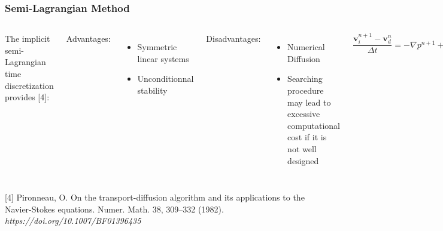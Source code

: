 \begin{frame} 
 \frametitle{\LARGE Semi-Lagrangian Method}

\begin{columns}[c]
\justifying
The implicit semi-Lagrangian time discretization provides [4]:

\medskip
Advantages:
\begin{itemize}
 \justifying
 \item Symmetric linear systems\\
 \item Unconditionnal stability
\end{itemize}

\vspace{0.5cm}
Disadvantages:
\begin{itemize}
 \justifying
 \item Numerical Diffusion\\
 \item Searching procedure may lead to excessive computational cost
       if it is not well designed
\end{itemize}


\begin{equation*}
 \frac{\textbf{v}_{i}^{n+1} - \textbf{v}_{d}^{n}}{\Delta t} = -\nabla p^{n+1} + \frac{1}{Re} \nabla^{2} \textbf{v}^{n+1}
\end{equation*}

\vspace{0.3cm}
\begin{equation*}
 \nabla \cdot \textbf{v} = 0
\end{equation*}

\vspace{0.1cm}
\begin{equation*}
 \frac{e_{i}^{n+1} - e_{d}^{n}}{\Delta t} = \frac{1}{ReSc} \nabla^{2} e^{n+1}
\end{equation*}
\end{columns}


\vspace{0.6cm}
\justifying
\tiny [4]
Pironneau, O. On the transport-diffusion algorithm and its applications to the Navier-Stokes equations. Numer. Math. 38, 309–332 (1982). \textit{https://doi.org/10.1007/BF01396435}
\end{frame}




